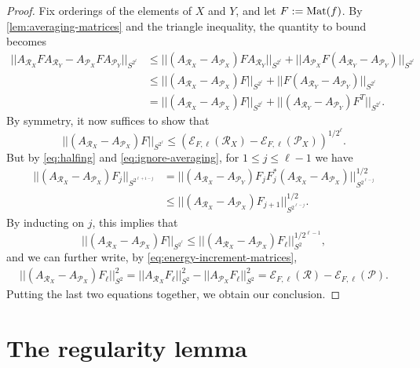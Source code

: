 \documentclass[reqno,11pt]{amsart}
\theoremstyle{definition}
\theoremstyle{remark}
\numberwithin{equation}{section}
\newcommand{\mE}{\mathcal{E}}
\newcommand{\mR}{\mathcal{R}}
\newcommand{\mP}{\mathcal{P}}
\newcommand{\Mat}{\textnormal{Mat}}
\begin{document}
\begin{proof}
Fix orderings of the elements of $X$ and $Y$, and let $F := \Mat(f)$. By \cref{lem:averaging-matrices} and the triangle inequality, the quantity to bound becomes
\[
\begin{aligned}
    ||A_{\mR_X} F A_{\mR_Y} - A_{\mP_X} F A_{\mP_Y}||_{S^{2^\ell}}
    &\le 
    ||(A_{\mR_X} - A_{\mP_X})F A_{\mR_Y}||_{S^{2^\ell}}
    +
    ||A_{\mP_X} F (A_{\mR_Y} - A_{\mP_Y})||_{S^{2^\ell}}
    \\
    &\le 
    ||(A_{\mR_X} - A_{\mP_X})F||_{S^{2^\ell}}
    +
    ||F (A_{\mR_Y} - A_{\mP_Y})||_{S^{2^\ell}}
    \\
    &=
    ||(A_{\mR_X} - A_{\mP_X})F||_{S^{2^\ell}}
    +
    ||(A_{\mR_Y} - A_{\mP_Y})F^T||_{S^{2^\ell}}.
\end{aligned}
\]
By symmetry, it now suffices to show that
\[
    ||(A_{\mR_X} - A_{\mP_X})F||_{S^{2^\ell}} \le \left(\mE_{F,\ell}(\mR_X) - \mE_{F,\ell}(\mP_X) \right)^{1/2^\ell}.
\]
But by \cref{eq:halfing} and \cref{eq:ignore-averaging}, for $1 \le j \le \ell-1$ we have
\[
\begin{aligned}
    ||(A_{\mR_X} - A_{\mP_X}) F_j||_{S^{2^{\ell+1-j}}} &= ||(A_{\mR_X} - A_{\mP_Y}) F_j F_j^* (A_{\mR_X} - A_{\mP_X})||^{1/2}_{S^{2^{\ell-j}}}
    \\
    &\le ||(A_{\mR_X} - A_{\mP_X}) F_{j+1}||^{1/2}_{S^{2^{\ell-j}}}.
\end{aligned}
\]
By inducting on $j$, this implies that
\[
    ||(A_{\mR_X} - A_{\mP_X}) F||_{S^{2^\ell}} \le ||(A_{\mR_X} - A_{\mP_X}) F_{\ell}||^{1/2^{\ell-1}}_{S^{2}},
\]
and we can further write, by \cref{eq:energy-increment-matrices},
\[
\begin{aligned}
    ||(A_{\mR_X} - A_{\mP_X}) F_{\ell}||_{S^2}^2
    =
    ||A_{\mR_X} F_{\ell}||_{S^2}^2 - 
    ||A_{\mP_X} F_{\ell}||_{S^2}^2
    = \mE_{F,\ell}(\mR) - \mE_{F,\ell}(\mP).
\end{aligned}
\]
Putting the last two equations together, we obtain our conclusion.
\end{proof}








\section{The regularity lemma} \label{sec:regularity}

\end{document}
